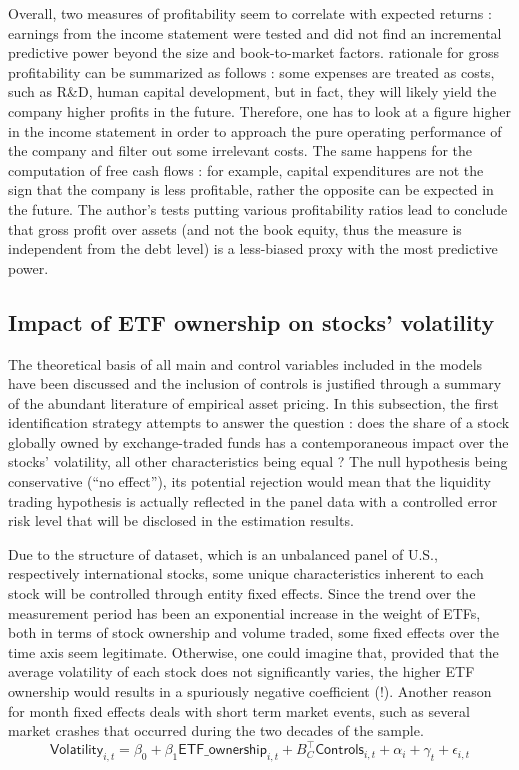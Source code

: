 Overall, two measures of profitability seem to correlate with expected returns : earnings from the income statement were tested and \textcite{Fama2006} did not find an incremental predictive power beyond the size and book-to-market factors. \textcite{Novy-Marx2013} rationale for gross profitability can be summarized as follows : some expenses are treated as costs, such as R\&D, human capital development, but in fact, they will likely yield the company higher profits in the future. Therefore, one has to look at a figure higher in the income statement in order to approach the pure operating performance of the company and filter out some irrelevant costs. The same happens for the computation of free cash flows : for example, capital expenditures are not the sign that the company is less profitable, rather the opposite can be expected in the future. The author's tests putting various profitability ratios lead to conclude that gross profit over assets (and not the book equity, thus the measure is independent from the debt level) is a less-biased proxy with the most predictive power.
\subsection{Impact of ETF ownership on stocks' volatility}
\label{subsec:Method:Volatility}
The theoretical basis of all main and control variables included in the models have been discussed and the inclusion of controls is justified through a summary of the abundant literature of empirical asset pricing. In this subsection, the first identification strategy attempts to answer the question : does the share of a stock globally owned by exchange-traded funds has a contemporaneous impact over the stocks' volatility, all other characteristics being equal ? The null hypothesis being conservative (``no effect''), its potential rejection would mean that the liquidity trading hypothesis is actually reflected in the panel data with a controlled error risk level that will be disclosed in the estimation results.

Due to the structure of dataset, which is an unbalanced panel of U.S., respectively international stocks, some unique characteristics inherent to each stock will be controlled through entity fixed effects. Since the trend over the measurement period has been an exponential increase in the weight of ETFs, both in terms of stock ownership and volume traded, some fixed effects over the time axis seem legitimate. Otherwise, one could imagine that, provided that the average volatility of each stock does not significantly varies, the higher ETF ownership would results in a spuriously negative coefficient (!). Another reason for month fixed effects deals with short term market events, such as several market crashes that occurred during the two decades of the sample. 
\begin{equation}
  \mathsf{Volatility}_{i,t} = \beta_{0} + \beta_{1} \mathsf{ETF\_ownership}_{i, t} + B_{C}^{\intercal} \mathsf{Controls}_{i, t} + \alpha_{i} + \gamma_{t} + \epsilon_{i, t}
\end{equation}

